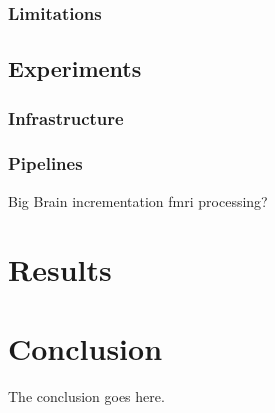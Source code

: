 \documentclass[10pt,journal,compsoc]{IEEEtran}
\begin{document}
\subsubsection{Limitations}

\subsection{Experiments}
\subsubsection{Infrastructure}
\subsubsection{Pipelines}
Big Brain incrementation
fmri processing?

\section{Results}


\section{Conclusion}
The conclusion goes here.






%
\end{document}
